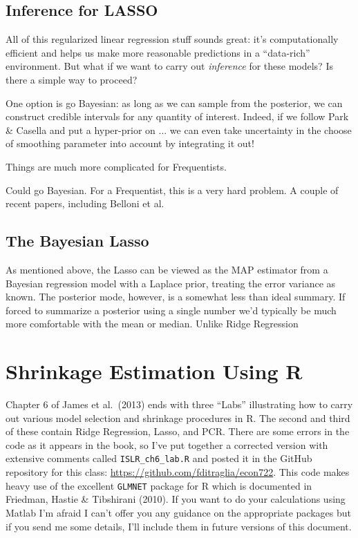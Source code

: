 \documentclass[12pt]{article}
\theoremstyle{definition}
\begin{document}
\subsection{Inference for LASSO}
All of this regularized linear regression stuff sounds great: it's computationally efficient and helps us make more reasonable predictions in a ``data-rich'' environment. But what if we want to carry out \emph{inference} for these models? Is there a simple way to proceed? 

One option is go Bayesian: as long as we can sample from the posterior, we can construct credible intervals for any quantity of interest. Indeed, if we follow Park \& Casella and put a hyper-prior on ... we can even take uncertainty in the choose of smoothing parameter into account by integrating it out! 

Things are much more complicated for Frequentists. 


Could go Bayesian. For a Frequentist, this is a very hard problem. A couple of recent papers, including Belloni et al.

\subsection{The Bayesian Lasso}
As mentioned above, the Lasso can be viewed as the MAP estimator from a Bayesian regression model with a Laplace prior, treating the error variance as known. The posterior mode, however, is a somewhat less than ideal summary. If forced to summarize a posterior using a single number we'd typically be much more comfortable with the mean or median. Unlike Ridge Regression


\section{Shrinkage Estimation Using R}
Chapter 6 of James et al.\ (2013) ends with three ``Labs'' illustrating how to carry out various model selection and shrinkage procedures in R. The second and third of these contain Ridge Regression, Lasso, and PCR. There are some errors in the code as it appears in the book, so I've put together a corrected version with extensive comments called \texttt{ISLR\_ch6\_lab.R} and posted it in the GitHub repository for this class: \url{https://github.com/fditraglia/econ722}. This code makes heavy use of the excellent \texttt{GLMNET} package for R which is documented in Friedman, Hastie \& Tibshirani (2010). If you want to do your calculations using Matlab I'm afraid I can't offer you any guidance on the appropriate packages but if you send me some details, I'll include them in future versions of this document.
\end{document}
